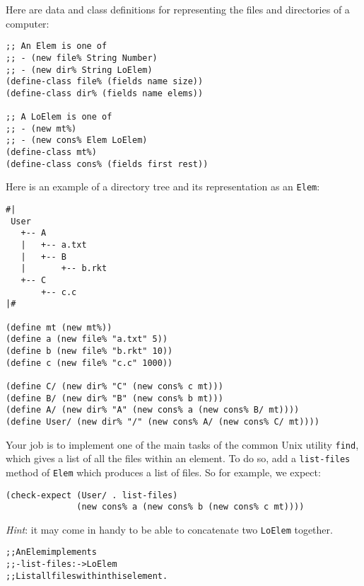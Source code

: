 \documentclass[12pt]{article}                   %
\def\pts#1{\marginpar{\footnotesize \raggedright  \fbox{#1 {\sc Points}}}}
\newenvironment{solution}{\color{Red}}{}
\begin{document}
\begin{problem} \pts{15}



Here are data and class definitions for representing the files and
directories of a computer:

\begin{verbatim}
;; An Elem is one of
;; - (new file% String Number)
;; - (new dir% String LoElem)
(define-class file% (fields name size))
(define-class dir% (fields name elems))

;; A LoElem is one of
;; - (new mt%)
;; - (new cons% Elem LoElem)
(define-class mt%)
(define-class cons% (fields first rest))    
\end{verbatim}


\noindent
Here is an example of a directory tree and its representation as an
\verb|Elem|:
\begin{verbatim}
#|
 User
   +-- A
   |   +-- a.txt
   |   +-- B
   |       +-- b.rkt
   +-- C
       +-- c.c
|#

(define mt (new mt%))
(define a (new file% "a.txt" 5))
(define b (new file% "b.rkt" 10))
(define c (new file% "c.c" 1000))

(define C/ (new dir% "C" (new cons% c mt)))
(define B/ (new dir% "B" (new cons% b mt)))
(define A/ (new dir% "A" (new cons% a (new cons% B/ mt))))
(define User/ (new dir% "/" (new cons% A/ (new cons% C/ mt))))
\end{verbatim}

\newpage
\noindent
Your job is to implement one of the main tasks of the common Unix
utility \verb|find|, which gives a list of all the files within an
element.  To do so, add a \verb|list-files| method of \verb|Elem|
which produces a list of files.  So for example, we expect:
\begin{verbatim}
(check-expect (User/ . list-files) 
              (new cons% a (new cons% b (new cons% c mt))))
\end{verbatim}
\emph{Hint}: it may come in handy to be able to concatenate two
\verb|LoElem| together.

\ifrubric
\else
{}
\fi

\begin{solution}
\begin{alltt}
;; An Elem implements
;; - list-files : -> LoElem
;;   List all files within this element.


\end{alltt}
\end{solution}
\end{problem}
\end{document}
